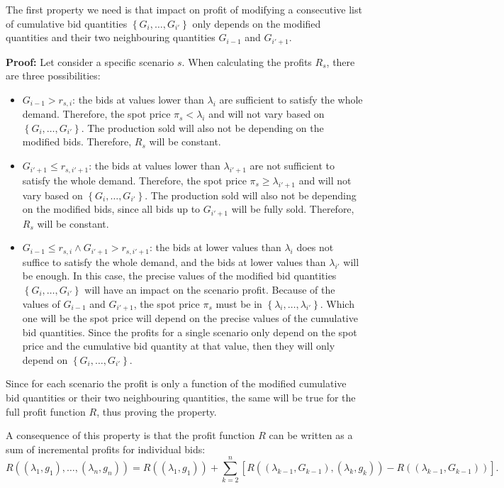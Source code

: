 \documentclass[12pt]{article}
\begin{document}
The first property we need is that impact on profit of modifying a consecutive
list of cumulative bid quantities $\left\{G_i, \ldots, G_{i'}\right\}$
only depends on the modified quantities and their two neighbouring quantities
$G_{i-1}$ and $G_{i'+1}$.

\textbf{Proof:} Let consider a specific scenario $s$. When calculating the
profits $R_s$, there are three possibilities:
\begin{itemize}
\item $G_{i-1} > r_{s,i}$: the bids at values lower than $\lambda_i$ are
sufficient to satisfy the whole demand. Therefore, the spot price $\pi_s <
\lambda_i$ and will not vary based on $\left\{G_i, \ldots, G_{i'}\right\}$.
The production sold will also not be depending on the modified bids. Therefore,
$R_s$ will be constant.
\item $G_{i'+1} \le r_{s,i'+1}$: the bids at values lower than $\lambda_{i'+1}$
are not sufficient to satisfy the whole demand. Therefore, the spot price
$\pi_s \ge \lambda_{i'+1}$ and will not vary based on
$\left\{G_i, \ldots, G_{i'}\right\}$. The production sold will also not be
depending on the modified bids, since all bids up to $G_{i'+1}$ will be
fully sold. Therefore, $R_s$ will be constant.
\item $G_{i-1} \le r_{s,i} \wedge G_{i'+1} > r_{s,i'+1}$: the bids at lower
values than $\lambda_i$ does not suffice to satisfy the whole demand, and
the bids at lower values than $\lambda_{i'}$ will be enough. In this
case, the precise values of the modified bid quantities
$\left\{G_i, \ldots, G_{i'}\right\}$ will have an impact on the scenario
profit. Because of the values of $G_{i-1}$ and $G_{i'+1}$, the spot price
$\pi_s$ must be in $\left\{\lambda_{i}, \ldots, \lambda_{i'}\right\}$.
Which one will be the spot price will depend on the precise values of the
cumulative bid quantities. Since the profits for a single scenario
only depend on the spot price and the cumulative bid quantity at that
value, then they will only depend on $\left\{G_i, \ldots, G_{i'}\right\}$.
\end{itemize}
Since for each scenario the profit is only a function of the modified
cumulative bid quantities or their two neighbouring quantities, the same
will be true for the full profit function $R$, thus proving the property.

A consequence of this property is that the profit function $R$ can be
written as a sum of incremental profits for individual bids:
\begin{equation}
R\left( (\lambda_1, g_1), \ldots, (\lambda_n, g_n) \right) =
R\left( (\lambda_1, g_1) \right) +
\sum_{k=2}^n \left[ R\left( (\lambda_{k-1}, G_{k-1}), (\lambda_k, g_k) \right) -
R\left( (\lambda_{k-1}, G_{k-1}) \right) \right].
\end{equation}
\end{document}
